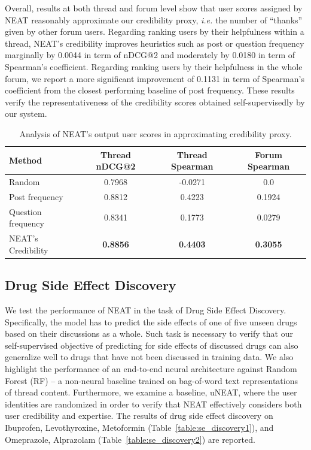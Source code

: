 \documentclass{bmcart}
\begin{document}
Overall, results at both thread and forum level show that user scores assigned by NEAT reasonably approximate our credibility proxy, \textit{i.e.} the number of ``thanks'' given by other forum users. Regarding ranking users by their helpfulness within a thread, NEAT's credibility improves heuristics such as post or question frequency marginally by 0.0044 in term of nDCG@2 and moderately by 0.0180 in term of Spearman's coefficient. Regarding ranking users by their helpfulness in the whole forum, we report a more significant improvement of 0.1131 in term of Spearman's coefficient from the closest performing baseline of post frequency. These results verify the representativeness of the credibility scores obtained self-supervisedly by our system.  

\begin{table}[t!]
  \captionsetup{justification=centering}
  \centering
  \scalebox{2}
  \footnotesize
  \begin{tabular}{l||c||c||c}
    \hline
    \textbf{Method}& Thread nDCG@2 & Thread Spearman & Forum Spearman \\\hline \hline
    Random  & 0.7968 & -0.0271 & 0.0 \\ \hline
    Post frequency & 0.8812 & 0.4223 & 0.1924 \\ \hline
    Question frequency & 0.8341 & 0.1773 & 0.0279 \\ \hline
    NEAT's Credibility & \textbf{0.8856} & \textbf{0.4403} & \textbf{0.3055} \\ \hline\hline
  \end{tabular}
  \caption{Analysis of NEAT's output user scores in approximating credibility proxy.}\label{table:credibility}
\end{table}

\subsection{Drug Side Effect Discovery}
We test the performance of NEAT in the task of Drug Side Effect Discovery. Specifically, the model has to predict the side effects of one of five unseen drugs based on their discussions as a whole. Such task is necessary to verify that our self-supervised objective of predicting for side effects of discussed drugs can also generalize well to
drugs that have not been discussed in training data. We also highlight the performance of an end-to-end neural architecture against Random Forest (RF) -- a non-neural baseline trained on bag-of-word text representations of thread content. Furthermore, we examine a baseline, uNEAT, where the user identities are randomized in order to verify that NEAT effectively considers both user credibility and expertise. The results of drug side effect discovery on Ibuprofen, Levothyroxine, Metoformin (Table~\ref{table:se_discovery1}), and Omeprazole, Alprazolam (Table~\ref{table:se_discovery2}) are reported. 
\end{document}
